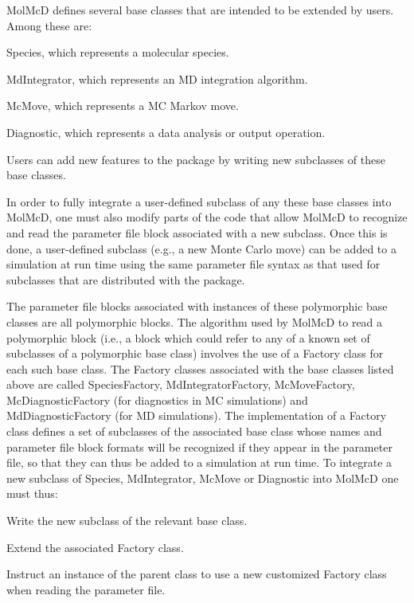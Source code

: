 Mol\+McD defines several base classes that are intended to be extended by users. Among these are\+: 
\begin{DoxyItemize}
\item Species, which represents a molecular species.  
\item Md\+Integrator, which represents an MD integration algorithm. 
\item Mc\+Move, which represents a MC Markov move.  
\item Diagnostic, which represents a data analysis or output operation.  
\end{DoxyItemize}Users can add new features to the package by writing new subclasses of these base classes.

In order to fully integrate a user-\/defined subclass of any these base classes into Mol\+McD, one must also modify parts of the code that allow Mol\+McD to recognize and read the parameter file block associated with a new subclass. Once this is done, a user-\/defined subclass (e.\+g., a new Monte Carlo move) can be added to a simulation at run time using the same parameter file syntax as that used for subclasses that are distributed with the package.

The parameter file blocks associated with instances of these polymorphic base classes are all polymorphic blocks. The algorithm used by Mol\+McD to read a polymorphic block (i.\+e., a block which could refer to any of a known set of subclasses of a polymorphic base class) involves the use of a Factory class for each such base class. The Factory classes associated with the base classes listed above are called Species\+Factory, Md\+Integrator\+Factory, Mc\+Move\+Factory, Mc\+Diagnostic\+Factory (for diagnostics in MC simulations) and Md\+Diagnostic\+Factory (for MD simulations). The implementation of a Factory class defines a set of subclasses of the associated base class whose names and parameter file block formats will be recognized if they appear in the parameter file, so that they can thus be added to a simulation at run time. To integrate a new subclass of Species, Md\+Integrator, Mc\+Move or Diagnostic into Mol\+McD one must thus\+:


\begin{DoxyItemize}
\item Write the new subclass of the relevant base class.
\item Extend the associated Factory class.
\item Instruct an instance of the parent class to use a new customized Factory class when reading the parameter file.
\end{DoxyItemize}

